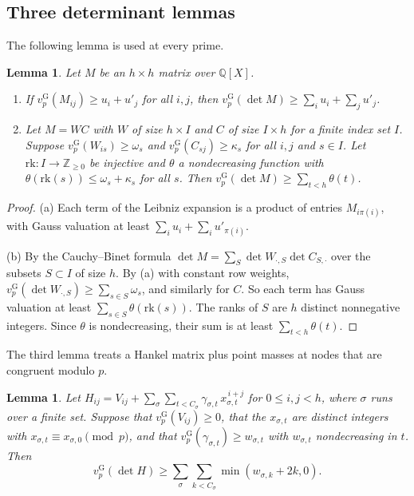 \documentclass[11pt]{amsart}
\newtheorem{lemma}[theorem]{Lemma}
\theoremstyle{definition}
\theoremstyle{remark}
\numberwithin{equation}{section}
\newcommand{\Z}{\mathbb Z}
\newcommand{\Q}{\mathbb Q}
\newcommand{\vG}{v_p^{\mathrm G}}
\begin{document}
\subsection{Three determinant lemmas}
The following lemma is used at every prime.

\begin{lemma}\label{tp:lem:det}
Let $M$ be an $h\times h$ matrix over $\Q[X]$.
\begin{enumerate}[label=(\alph*)]
\item If $\vG(M_{ij})\ge u_i+u'_j$ for all $i,j$, then $\vG(\det M)\ge\sum_iu_i+\sum_ju'_j$.
\item Let $M=WC$ with $W$ of size $h\times I$ and $C$ of size $I\times h$ for a finite index set $I$. Suppose
 $\vG(W_{is})\ge\omega_s$ and $\vG(C_{sj})\ge\kappa_s$ for all $i,j$ and $s\in I$. Let $\mathrm{rk}:I\to\Z_{\ge0}$ be
 injective and $\theta$ a nondecreasing function with $\theta(\mathrm{rk}(s))\le\omega_s+\kappa_s$ for all $s$. Then
 $\vG(\det M)\ge\sum_{t<h}\theta(t)$.
\end{enumerate}
\end{lemma}

\begin{proof}
(a) Each term of the Leibniz expansion is a product of entries $M_{i\pi(i)}$, with Gauss valuation at least
$\sum_iu_i+\sum_iu'_{\pi(i)}$.

(b) By the Cauchy--Binet formula $\det M=\sum_S\det W_{\cdot,S}\det C_{S,\cdot}$ over the subsets $S\subset I$ of size
$h$. By (a) with constant row weights, $\vG(\det W_{\cdot,S})\ge\sum_{s\in S}\omega_s$, and similarly for $C$. So each term
has Gauss valuation at least $\sum_{s\in S}\theta(\mathrm{rk}(s))$. The ranks of $S$ are $h$ distinct nonnegative
integers. Since $\theta$ is nondecreasing, their sum is at least $\sum_{t<h}\theta(t)$.
\end{proof}

The third lemma treats a Hankel matrix plus point masses at nodes that are congruent modulo $p$.

\begin{lemma}\label{tp:lem:rankone}
Let $H_{ij}=V_{ij}+\sum_{\sigma}\sum_{t<C_\sigma}\gamma_{\sigma,t}\,x_{\sigma,t}^{\,i+j}$ for $0\le i,j<h$, where
$\sigma$ runs over a finite set. Suppose that $\vG(V_{ij})\ge0$, that the $x_{\sigma,t}$ are distinct integers with
$x_{\sigma,t}\equiv x_{\sigma,0}\pmod p$, and that $\vG(\gamma_{\sigma,t})\ge w_{\sigma,t}$ with $w_{\sigma,t}$
nondecreasing in $t$. Then
\[
 \vG(\det H)\ge\sum_\sigma\sum_{k<C_\sigma}\min(w_{\sigma,k}+2k,0).
\]
\end{lemma}
\end{document}
